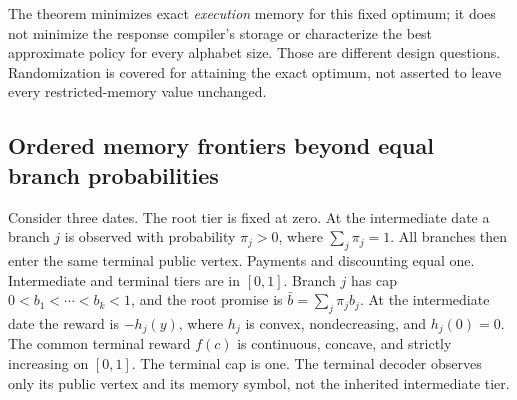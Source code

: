 The theorem minimizes exact \emph{execution} memory for this fixed optimum; it does not minimize the response compiler's storage or characterize the best approximate policy for every alphabet size. Those are different design questions. Randomization is covered for attaining the exact optimum, not asserted to leave every restricted-memory value unchanged.

\subsection{Ordered memory frontiers beyond equal branch probabilities}
Consider three dates. The root tier is fixed at zero. At the intermediate date a branch $j$ is observed with probability $\pi_j>0$, where $\sum_j\pi_j=1$. All branches then enter the same terminal public vertex. Payments and discounting equal one. Intermediate and terminal tiers are in $[0,1]$. Branch $j$ has cap $0<b_1<\cdots<b_k<1$, and the root promise is $\bar b=\sum_j\pi_jb_j$. At the intermediate date the reward is $-h_j(y)$, where $h_j$ is convex, nondecreasing, and $h_j(0)=0$. The common terminal reward $f(c)$ is continuous, concave, and strictly increasing on $[0,1]$. The terminal cap is one. The terminal decoder observes only its public vertex and its memory symbol, not the inherited intermediate tier.

